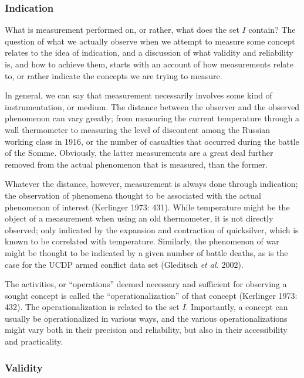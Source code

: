 \documentclass[12pt,twoside]{reedthesis}
\begin{document}
\subsubsection{Indication}\label{indication}

What is measurement performed on, or rather, what does the set \(I\)
contain? The question of what we actually observe when we attempt to
measure some concept relates to the idea of indication, and a discussion
of what validity and reliability is, and how to achieve them, starts
with an account of how measurements relate to, or rather indicate the
concepts we are trying to measure.

In general, we can say that measurement necessarily involves some kind
of instrumentation, or medium. The distance between the observer and the
observed phenomenon can vary greatly; from measuring the current
temperature through a wall thermometer to measuring the level of
discontent among the Russian working class in 1916, or the number of
casualties that occurred during the battle of the Somme. Obviously, the
latter measurements are a great deal further removed from the actual
phenomenon that is measured, than the former.

Whatever the distance, however, measurement is always done through
indication; the observation of phenomena thought to be associated with
the actual phenomenon of interest (Kerlinger 1973: 431). While
temperature might be the object of a measurement when using an old
thermometer, it is not directly observed; only indicated by the
expansion and contraction of quicksilver, which is known to be
correlated with temperature. Similarly, the phenomenon of war might be
thought to be indicated by a given number of battle deaths, as is the
case for the UCDP armed conflict data set (Gleditsch \emph{et al.}
2002).

The activities, or ``operations'' deemed necessary and sufficient for
observing a sought concept is called the ``operationalization'' of that
concept (Kerlinger 1973: 432). The operationalization is related to the
set \(I\). Importantly, a concept can usually be operationalized in
various ways, and the various operationalizations might vary both in
their precision and reliability, but also in their accessibility and
practicality.

\subsubsection{Validity}\label{validity}
\end{document}
